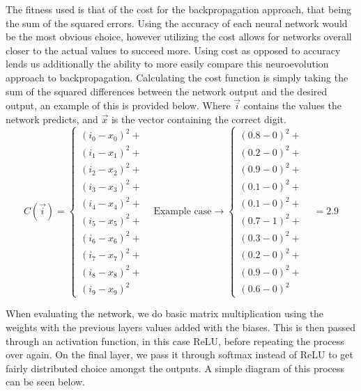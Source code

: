 \documentclass[12pt]{report}
\begin{document}
\par The fitness used is that of the cost for the backpropagation approach, that being the
sum of the squared errors. Using the accuracy of each neural network would be the most
obvious choice, however utilizing the cost allows for networks overall closer to the
actual values to succeed more. Using cost as opposed to accuracy lends us additionally
the ability to more easily compare this neuroevolution approach to backpropagation.
Calculating the cost function is simply taking the sum of the squared differences
between the network output and the desired output, an example of this is provided below.
Where $\vec{i}$ contains the values the network predicts, and $\vec{x}$ is the
vector containing the correct digit.
\begin{equation*}
    C(\vec{i}) = 
    \begin{cases}
        (i_0-x_0)^2+& \\
        (i_1-x_1)^2+& \\
        (i_2-x_2)^2+& \\
        (i_3-x_3)^2+& \\
        (i_4-x_4)^2+& \\
        (i_5-x_5)^2+& \\
        (i_6-x_6)^2+& \\
        (i_7-x_7)^2+& \\
        (i_8-x_8)^2+& \\
        (i_9-x_9)^2&
    \end{cases}
    \text{Example case}
    \to \begin{cases}
        (0.8-0)^2+& \\
        (0.2-0)^2+& \\
        (0.9-0)^2+& \\
        (0.1-0)^2+& \\
        (0.1-0)^2+& \\
        (0.7-1)^2+& \\
        (0.3-0)^2+& \\
        (0.2-0)^2+& \\
        (0.9-0)^2+& \\
        (0.6-0)^2&
    \end{cases}
     = 2.9
\end{equation*}

When evaluating the network, we do basic matrix multiplication using the weights with
the previous layers values added with the biases. This is then passed through an activation function, in this
case ReLU, before repeating the process over again. On the final layer, we pass it
through softmax instead of ReLU to get fairly distributed choice amongst the outputs. A simple diagram of this process can be seen below.
\end{document}
